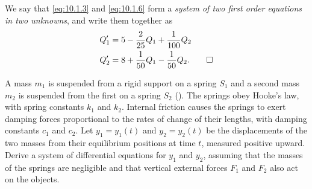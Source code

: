 \begin{solution}
We say that \eqref{eq:10.1.3} and \eqref{eq:10.1.6}  form a \emph{\color{blue}system of two
first order equations in two unknowns}, and write them together as
\begin{align*}
Q_1'&=5-\frac{2}{25}Q_1+\frac{1}{100}Q_2\\
Q_2'&=8+\frac{1}{50}Q_1-\frac{1}{50}Q_2. \qedhere
\end{align*}
\end{solution}

\begin{example}\label{example:10.1.2}
A mass $m_1$ is suspended from a rigid support on a spring $S_1$ and a
second mass $m_2$ is suspended from the first on a spring $S_2$
(). The springs obey Hooke's law, with spring
constants $k_1$ and $k_2$. Internal friction causes the springs to
exert damping forces proportional to the rates of change of their
lengths, with damping constants $c_1$ and $c_2$. Let $y_1=y_1(t)$ and
$y_2=y_2(t)$ be the displacements of the two masses from their
equilibrium positions at time $t$, measured positive upward.
 Derive a system of differential equations
for $y_1$ and $y_2$, assuming that the masses of the springs are
negligible and that vertical external forces $F_1$ and $F_2$ also act
on the objects.
\end{example}

